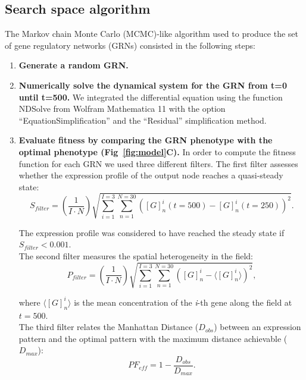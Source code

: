 \documentclass[10pt,letterpaper]{article}
\begin{document}
\subsection*{Search space algorithm}

The Markov chain Monte Carlo (MCMC)-like algorithm used to produce the set of
gene regulatory networks (GRNs) consisted in the following steps:

\begin{enumerate}
 \item{\bf Generate a random GRN.}

 \item{\bf Numerically solve the dynamical system for the GRN from t=0 until
 t=500.} We integrated the differential equation using the function NDSolve from
 Wolfram Mathematica 11 with the option “EquationSimplification” and the
 “Residual” simplification method.

 \item{\bf Evaluate fitness by comparing the GRN phenotype with the optimal
 phenotype (Fig~\ref{fig:model}C).} In order to compute the fitness
 function for each GRN we used three different filters. The first filter
 assesses whether the expression profile of the output node reaches a
 quasi-steady state:
 \begin{equation}
  S_{filter} = \left( \frac{1}{I \cdot N}\right) \sqrt{\sum_{i=1}^{I=3}
  \sum_{n=1}^{N=30} ([G]_n^i(t=500) - [G]^i_n(t=250))^2}.
 \end{equation}

 The expression profile was considered to have reached the steady state if
 $S_{filter} < 0.001$.\\

 The second filter measures the spatial heterogeneity in the field:
 \begin{equation}
  P_{filter} = \left( \frac{1}{I \cdot N} \right) \sqrt{ \sum_{i=1}^{I=3}
  \sum_{n=1}^{N=30} \left( [G]^i_n - \langle [G]^i_n \rangle \right)^2 },
 \end{equation}

 where $\langle [G]^i_n \rangle$ is the mean concentration of the \emph{i}-th
 gene along the field at $t=500$.\\

 The third filter relates the Manhattan Distance ($D_{obs}$) between an
 expression pattern and the optimal pattern with the maximum distance achievable
 ($D_{max}$):
 \begin{equation}
  \mathit{PF}_{eff} = 1 - \frac{D_{obs}}{D_{max}}.
 \end{equation}


\end{enumerate}
\end{document}
